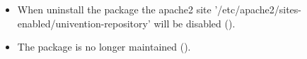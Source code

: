 \begin{itemize}
\item When uninstall the  package  the apache2
site '/etc/apache2/sites-enabled/univention-repository' will be disabled
().

\item The package  is no longer maintained
().

\end{itemize}

